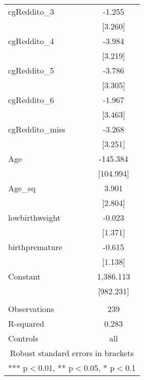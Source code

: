 \documentclass[]{article}
\begin{document}
\begin{tabular}{lc}
cgReddito\_3 & -1.255 \\
 & [3.260] \\
cgReddito\_4 & -3.984 \\
 & [3.219] \\
cgReddito\_5 & -3.786 \\
 & [3.305] \\
cgReddito\_6 & -1.967 \\
 & [3.463] \\
cgReddito\_miss & -3.268 \\
 & [3.251] \\
Age & -145.384 \\
 & [104.994] \\
Age\_sq & 3.901 \\
 & [2.804] \\
lowbirthweight & -0.023 \\
 & [1.371] \\
birthpremature & -0.615 \\
 & [1.138] \\
Constant & 1,386.113 \\
 & [982.231] \\
 &  \\
Observations & 239 \\
R-squared & 0.283 \\
 Controls & all \\ \hline
\multicolumn{2}{c}{ Robust standard errors in brackets} \\
\multicolumn{2}{c}{ *** p$<$0.01, ** p$<$0.05, * p$<$0.1} \\
\end{tabular}
\end{document}
